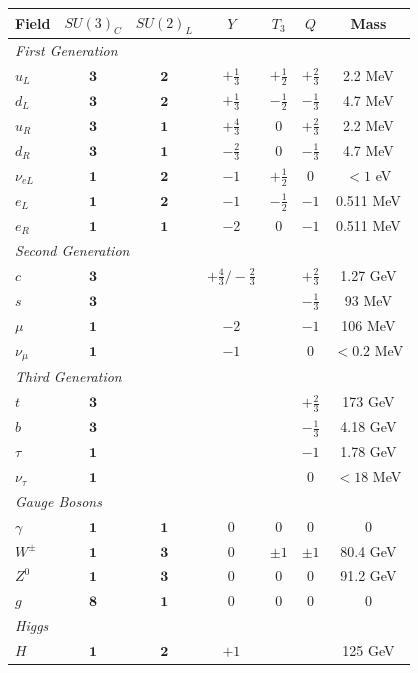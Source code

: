 \documentclass[11pt,a4paper,openright]{book}
\theoremstyle{plain}
\theoremstyle{definition}
\begin{document}
\begin{center}
\begin{tabular}{lcccccc}
\toprule
\textbf{Field} & $SU(3)_C$ & $SU(2)_L$ & $Y$ & $T_3$ & $Q$ & \textbf{Mass} \\
\midrule
\multicolumn{7}{l}{\textit{First Generation}} \\
$u_L$ & $\mathbf{3}$ & $\mathbf{2}$ & $+\frac{1}{3}$ & $+\frac{1}{2}$ & $+\frac{2}{3}$ & 2.2 MeV \\
$d_L$ & $\mathbf{3}$ & $\mathbf{2}$ & $+\frac{1}{3}$ & $-\frac{1}{2}$ & $-\frac{1}{3}$ & 4.7 MeV \\
$u_R$ & $\mathbf{3}$ & $\mathbf{1}$ & $+\frac{4}{3}$ & $0$ & $+\frac{2}{3}$ & 2.2 MeV \\
$d_R$ & $\mathbf{3}$ & $\mathbf{1}$ & $-\frac{2}{3}$ & $0$ & $-\frac{1}{3}$ & 4.7 MeV \\
$\nu_{eL}$ & $\mathbf{1}$ & $\mathbf{2}$ & $-1$ & $+\frac{1}{2}$ & $0$ & $< 1$ eV \\
$e_L$ & $\mathbf{1}$ & $\mathbf{2}$ & $-1$ & $-\frac{1}{2}$ & $-1$ & 0.511 MeV \\
$e_R$ & $\mathbf{1}$ & $\mathbf{1}$ & $-2$ & $0$ & $-1$ & 0.511 MeV \\
\midrule
\multicolumn{7}{l}{\textit{Second Generation}} \\
$c$ & $\mathbf{3}$ & & $+\frac{4}{3}/-\frac{2}{3}$ & & $+\frac{2}{3}$ & 1.27 GeV \\
$s$ & $\mathbf{3}$ & & & & $-\frac{1}{3}$ & 93 MeV \\
$\mu$ & $\mathbf{1}$ & & $-2$ & & $-1$ & 106 MeV \\
$\nu_\mu$ & $\mathbf{1}$ & & $-1$ & & $0$ & $< 0.2$ MeV \\
\midrule
\multicolumn{7}{l}{\textit{Third Generation}} \\
$t$ & $\mathbf{3}$ & & & & $+\frac{2}{3}$ & 173 GeV \\
$b$ & $\mathbf{3}$ & & & & $-\frac{1}{3}$ & 4.18 GeV \\
$\tau$ & $\mathbf{1}$ & & & & $-1$ & 1.78 GeV \\
$\nu_\tau$ & $\mathbf{1}$ & & & & $0$ & $< 18$ MeV \\
\midrule
\multicolumn{7}{l}{\textit{Gauge Bosons}} \\
$\gamma$ & $\mathbf{1}$ & $\mathbf{1}$ & $0$ & $0$ & $0$ & $0$ \\
$W^\pm$ & $\mathbf{1}$ & $\mathbf{3}$ & $0$ & $\pm 1$ & $\pm 1$ & 80.4 GeV \\
$Z^0$ & $\mathbf{1}$ & $\mathbf{3}$ & $0$ & $0$ & $0$ & 91.2 GeV \\
$g$ & $\mathbf{8}$ & $\mathbf{1}$ & $0$ & $0$ & $0$ & $0$ \\
\midrule
\multicolumn{7}{l}{\textit{Higgs}} \\
$H$ & $\mathbf{1}$ & $\mathbf{2}$ & $+1$ & & & 125 GeV \\
\bottomrule
\end{tabular}
\end{center}
\end{document}
